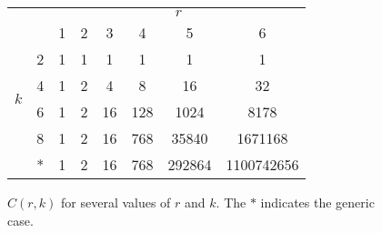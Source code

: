 \documentclass[11pt,reqno]{amsart}
\theoremstyle{definition}
\theoremstyle{problem}
\theoremstyle{plain}
\theoremstyle{remark}
\theoremstyle{theorem}
\numberwithin{equation}{section}
\numberwithin{figure}{section}
\begin{document}
\begin{figure}[H]
    \centering
    \begin{tabular}{c c|c c c c c c|}
    \cline{3-8}
    & & \multicolumn{6}{c|}{$r$}\\ \cline{3-8}
    & & 1 & 2 & 3 & 4 & 5 & 6 \\\cline{1-8}
    \multicolumn{1}{|c|}{\multirow{4}{*}{$k$}} & 2 & 1 & 1 & 1 & 1 & 1 & 1\\
    \multicolumn{1}{|c|}{} & 4 & 1 & 2 & 4 & 8 & 16 & 32\\
    \multicolumn{1}{|c|}{} & 6 & 1 & 2 & 16 & 128 & 1024 & 8178\\
    \multicolumn{1}{|c|}{} & 8 & 1 & 2 & 16 & 768 & 35840 & 1671168\\
    \multicolumn{1}{|c|}{} & * & 1 & 2 & 16 & 768 & 292864 & 1100742656\\\hline
    \end{tabular}
    \caption{$C(r,k)$ for several values of $r$ and $k$.  The $*$
      indicates the generic case.}
    \label{figure:keven}
\end{figure}
\end{document}

